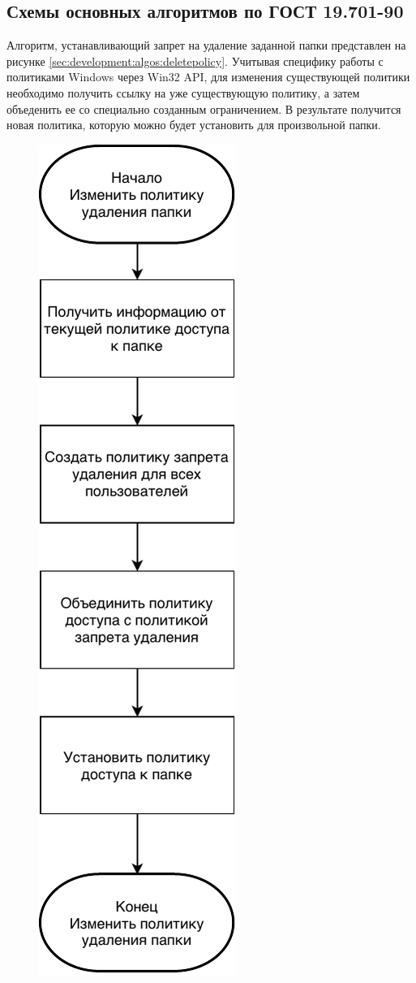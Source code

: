 \subsection{Схемы основных алгоритмов по ГОСТ 19.701-90} 
\label{sec:development:algos}

Алгоритм, устанавливающий запрет на удаление заданной папки представлен на рисунке \ref*{sec:development:algos:deletepolicy}. Учитывая специфику работы с политиками Windows через Win32 API, для изменения существующей политики необходимо получить ссылку на уже существующую политику, а затем объеденить ее со специально созданным ограничением. В результате получится новая политика, которую можно будет установить для произвольной папки.

\begin{figure}[!hb]
	\centering
	  \includegraphics[scale=1]{attachments/DeletePolicy.pdf}  

\end{figure}
